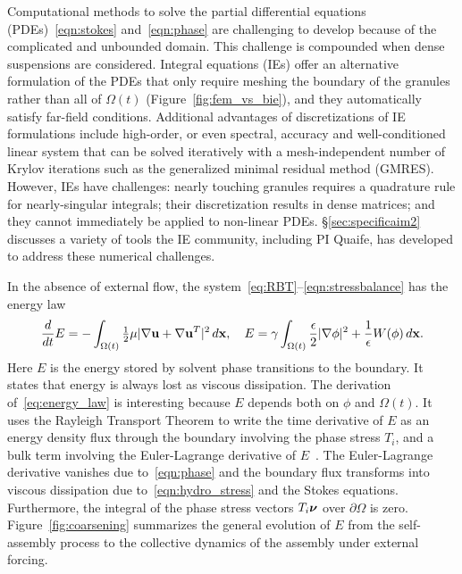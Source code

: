 Computational methods to solve the partial differential equations
(PDEs)~\eqref{eqn:stokes} and~\eqref{eqn:phase} are challenging to
develop because of the complicated and unbounded domain. This challenge
is compounded when dense suspensions are considered. Integral equations
(IEs) offer an alternative formulation of the PDEs that only require
meshing the boundary of the granules rather than all of $\Omega(t)$
(Figure~\ref{fig:fem_vs_bie}), and they automatically satisfy far-field
conditions. Additional advantages of discretizations of IE formulations
include high-order, or even spectral, accuracy and well-conditioned
linear system that can be solved iteratively with a mesh-independent
number of Krylov iterations such as the generalized minimal residual
method (GMRES). However, IEs have challenges: nearly touching granules
requires a quadrature rule for nearly-singular integrals; their
discretization results in dense matrices; and they cannot immediately be
applied to non-linear PDEs. \S\ref{sec:specificaim2} discusses a variety
of tools the IE community, including PI Quaife, has developed to address
these numerical challenges.

In the absence of external flow, the
system~\eqref{eq:RBT}--\eqref{eqn:stressbalance} has the energy law
\begin{align}
\label{eq:energy_law}
  \frac{d}{dt}E
  = - \int_{\Omega(t)}\tfrac{1}{2}\mu|\nabla \mathbf{u} + \nabla
  \mathbf{u}^T|^2 \,d\mathbf{x},\quad
    E = \gamma \int_{\Omega(t)}
  \frac{\epsilon}{2} |\nabla \phi|^2 + \frac{1}{\epsilon} W(\phi) \,d\mathbf{x}.
\end{align}
Here $E$ is the energy stored by solvent phase transitions to the
boundary. It states that energy is always lost as viscous
dissipation. The derivation of~\eqref{eq:energy_law} is interesting
because $E$ depends both on $\phi$ and $\Omega(t)$. It uses the Rayleigh
Transport Theorem to write the time derivative of $E$ as an energy
density flux through the boundary involving the phase stress $T_i$, and
a bulk term involving the Euler-Lagrange derivative of
$E$~\cite{Fu2018_SIAM}. The Euler-Lagrange derivative vanishes due
to~\eqref{eqn:phase} and the boundary flux transforms into viscous
dissipation due to~\eqref{eqn:hydro_stress} and the Stokes equations.
Furthermore, the integral of the phase stress vectors $T_i\boldsymbol{\nu}$ over
$\partial \Omega$ is zero. Figure~\ref{fig:coarsening} summarizes the
general evolution of $E$ from the self-assembly process to the
collective dynamics of the assembly under external forcing.


